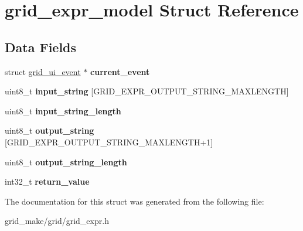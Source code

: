 \hypertarget{structgrid__expr__model}{\section{grid\-\_\-expr\-\_\-model Struct Reference}
\label{structgrid__expr__model}
}
\subsection*{Data Fields}
\begin{DoxyCompactItemize}
\item 
\hypertarget{structgrid__expr__model_a08bacf3211c4a70b0e12bdf541f583e0}{struct \hyperlink{structgrid__ui__event}{grid\-\_\-ui\-\_\-event} $\ast$ {\bfseries current\-\_\-event}}\label{structgrid__expr__model_a08bacf3211c4a70b0e12bdf541f583e0}

\item 
\hypertarget{structgrid__expr__model_a12ebc8373d33295e6402c5e88e4eaffd}{uint8\-\_\-t {\bfseries input\-\_\-string} \mbox{[}G\-R\-I\-D\-\_\-\-E\-X\-P\-R\-\_\-\-O\-U\-T\-P\-U\-T\-\_\-\-S\-T\-R\-I\-N\-G\-\_\-\-M\-A\-X\-L\-E\-N\-G\-T\-H\mbox{]}}\label{structgrid__expr__model_a12ebc8373d33295e6402c5e88e4eaffd}

\item 
\hypertarget{structgrid__expr__model_a6a3e839a4d5be657b337cfec56685004}{uint8\-\_\-t {\bfseries input\-\_\-string\-\_\-length}}\label{structgrid__expr__model_a6a3e839a4d5be657b337cfec56685004}

\item 
\hypertarget{structgrid__expr__model_a6301095acb014ea93ed02d957f7dfff9}{uint8\-\_\-t {\bfseries output\-\_\-string} \mbox{[}G\-R\-I\-D\-\_\-\-E\-X\-P\-R\-\_\-\-O\-U\-T\-P\-U\-T\-\_\-\-S\-T\-R\-I\-N\-G\-\_\-\-M\-A\-X\-L\-E\-N\-G\-T\-H+1\mbox{]}}\label{structgrid__expr__model_a6301095acb014ea93ed02d957f7dfff9}

\item 
\hypertarget{structgrid__expr__model_a6f49602d8c1b33ebef4b9a5b9aa3e0dd}{uint8\-\_\-t {\bfseries output\-\_\-string\-\_\-length}}\label{structgrid__expr__model_a6f49602d8c1b33ebef4b9a5b9aa3e0dd}

\item 
\hypertarget{structgrid__expr__model_a899a53cefa3a270c10c2509dd961c667}{int32\-\_\-t {\bfseries return\-\_\-value}}\label{structgrid__expr__model_a899a53cefa3a270c10c2509dd961c667}

\end{DoxyCompactItemize}


The documentation for this struct was generated from the following file\-:\begin{DoxyCompactItemize}
\item 
grid\-\_\-make/grid/grid\-\_\-expr.\-h\end{DoxyCompactItemize}
